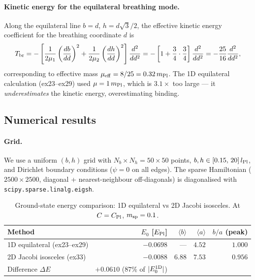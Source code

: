 \paragraph{Kinetic energy for the equilateral breathing mode.}
Along the equilateral line $b=d$, $h=d\sqrt{3}/2$, the effective kinetic
energy coefficient for the breathing coordinate $d$ is
\begin{equation}
  T_{\rm br} = -\left[\frac{1}{2\mu_1}\left(\frac{db}{dd}\right)^2
                + \frac{1}{2\mu_2}\left(\frac{dh}{dd}\right)^2\right]
               \frac{d^2}{dd^2}
  = -\left[1 + \frac{3}{4}\cdot\frac{3}{4}\right]\frac{d^2}{dd^2}
  = -\frac{25}{16}\frac{d^2}{dd^2},
\end{equation}
corresponding to effective mass $\mu_{\rm eff} = 8/25 = 0.32\,m_{\rm Pl}$.
The 1D equilateral calculation (ex23--ex29) used $\mu=1\,m_{\rm Pl}$,
which is $3.1\times$ too large — it \emph{underestimates} the kinetic energy,
overestimating binding.

\subsection{Numerical results}

\paragraph{Grid.}
We use a uniform $(b,h)$ grid with $N_b\times N_h = 50\times50$ points,
$b,h\in[0.15,\,20]\,l_{\rm Pl}$, and Dirichlet boundary conditions
($\psi=0$ on all edges).  The sparse Hamiltonian
($2500\times2500$, diagonal + nearest-neighbour off-diagonals) is diagonalised
with \texttt{scipy.sparse.linalg.eigsh}.

\begin{table}[h]
\centering
\caption{Ground-state energy comparison: 1D equilateral vs 2D Jacobi isosceles.
At $C=C_{\rm Pl}$, $m_{\rm sp}=0.1$.}
\label{tab:2d_iso_comparison}
\begin{tabular}{lrrrr}
\hline
Method & $E_0$ [$E_{\rm Pl}$] & $\langle b\rangle$ & $\langle a\rangle$ & $b/a$ (peak) \\
\hline
1D equilateral (ex23--ex29) & $-0.0698$ & --- & $4.52$ & $1.000$ \\
2D Jacobi isosceles (ex33) & $-0.0088$ & $6.88$ & $7.53$ & $0.956$ \\
\hline
Difference $\Delta E$ & $+0.0610$ ($87\%$ of $|E_0^{\rm 1D}|$) & & & \\
\hline
\end{tabular}
\end{table}

